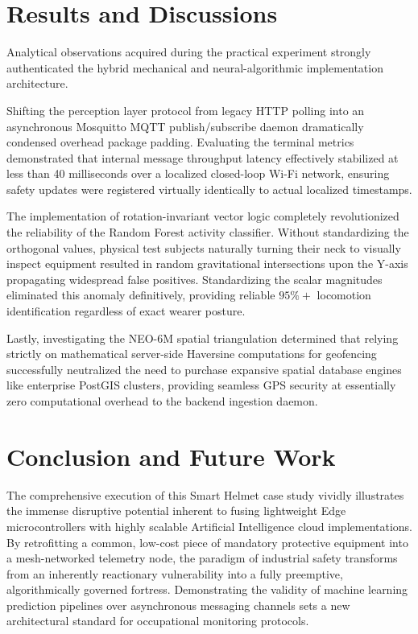 \documentclass[11pt, conference, a4paper]{IEEEtran}
\begin{document}
\section{Results and Discussions}
Analytical observations acquired during the practical experiment strongly authenticated the hybrid mechanical and neural-algorithmic implementation architecture. 

Shifting the perception layer protocol from legacy HTTP polling into an asynchronous Mosquitto MQTT publish/subscribe daemon dramatically condensed overhead package padding. Evaluating the terminal metrics demonstrated that internal message throughput latency effectively stabilized at less than 40 milliseconds over a localized closed-loop Wi-Fi network, ensuring safety updates were registered virtually identically to actual localized timestamps.

The implementation of rotation-invariant vector logic completely revolutionized the reliability of the Random Forest activity classifier. Without standardizing the orthogonal values, physical test subjects naturally turning their neck to visually inspect equipment resulted in random gravitational intersections upon the Y-axis propagating widespread false positives. Standardizing the scalar magnitudes eliminated this anomaly definitively, providing reliable $95\%+$ locomotion identification regardless of exact wearer posture.

Lastly, investigating the NEO-6M spatial triangulation determined that relying strictly on mathematical server-side Haversine computations for geofencing successfully neutralized the need to purchase expansive spatial database engines like enterprise PostGIS clusters, providing seamless GPS security at essentially zero computational overhead to the backend ingestion daemon.

\section{Conclusion and Future Work}
The comprehensive execution of this Smart Helmet case study vividly illustrates the immense disruptive potential inherent to fusing lightweight Edge microcontrollers with highly scalable Artificial Intelligence cloud implementations. By retrofitting a common, low-cost piece of mandatory protective equipment into a mesh-networked telemetry node, the paradigm of industrial safety transforms from an inherently reactionary vulnerability into a fully preemptive, algorithmically governed fortress. Demonstrating the validity of machine learning prediction pipelines over asynchronous messaging channels sets a new architectural standard for occupational monitoring protocols.
\end{document}
